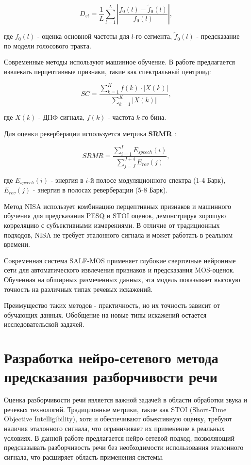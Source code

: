 \documentclass[oneside, final, 14pt]{extarticle}
\begin{document}
\begin{equation}
	D_{vt} = \frac{1}{L}\sum_{l=1}^{L} \left| \frac{f_0(l) - \tilde{f}_0(l)}{f_0(l)} \right|,
\end{equation}

где $f_0(l)$ - оценка основной частоты для $l$-го сегмента, $\tilde{f}_0(l)$ - предсказание по модели голосового тракта.

Современные методы используют машинное обучение. В работе \cite{Falk2004} предлагается извлекать перцептивные признаки, такие как спектральный центроид:

\begin{equation}
	SC = \frac{\sum_{k=1}^{K} f(k) \cdot |X(k)|}{\sum_{k=1}^{K} |X(k)|},
\end{equation}

где $X(k)$ - ДПФ сигнала, $f(k)$ - частота $k$-го бина.

Для оценки реверберации используется метрика \textbf{SRMR} \cite{Falk2010}:

\begin{equation}
	SRMR = \frac{\sum_{i=1}^{I} E_{speech}(i)}{\sum_{j=J}^{J+4} E_{rev}(j)},
\end{equation}

где $E_{speech}(i)$ - энергия в $i$-й полосе модуляционного спектра (1-4 Барк), $E_{rev}(j)$ - энергия в полосах реверберации (5-8 Барк).

Метод NISA использует комбинацию перцептивных признаков и машинного обучения для предсказания PESQ и STOI оценок, демонстрируя хорошую корреляцию с субъективными измерениями. В отличие от традиционных подходов, NISA не требует эталонного сигнала и может работать в реальном времени.

Современная система SALF-MOS применяет глубокие сверточные нейронные сети для автоматического извлечения признаков и предсказания MOS-оценок. Обученная на обширных размеченных данных, эта модель показывает высокую точность на различных типах речевых искажений.

Преимущество таких методов - практичность, но их точность зависит от обучающих данных. Обобщение на новые типы искажений остается исследовательской задачей.

\newpage
\section{Разработка нейро-сетевого метода предсказания разборчивости речи}

Оценка разборчивости речи является важной задачей в области обработки звука и речевых технологий. Традиционные метрики, такие как STOI (Short-Time Objective Intelligibility), хотя и обеспечивают объективную оценку, требуют наличия эталонного сигнала, что ограничивает их применение в реальных условиях. В данной работе предлагается нейро-сетевой подход, позволяющий предсказывать разборчивость речи без необходимости использования эталонного сигнала, что расширяет область применения системы.
\end{document}
